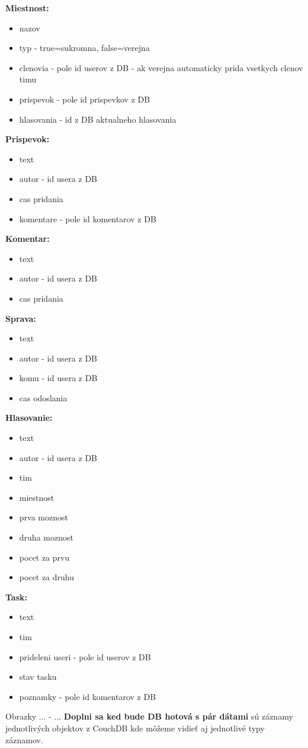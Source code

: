 \textbf{Miestnost:}
\indent\begin{itemize}
    \item nazov
    \item typ - true=sukromna, false=verejna
    \item clenovia - pole id userov z DB - ak verejna automaticky prida vsetkych clenov timu
    \item prispevok - pole id prispevkov z DB
    \item hlasovania - id z DB aktualneho hlasovania
\end{itemize}

\textbf{Prispevok:}
\indent\begin{itemize}
    \item text
    \item autor - id usera z DB
    \item cas pridania
    \item komentare - pole id komentarov z DB
\end{itemize}

\textbf{Komentar:}
\indent\begin{itemize}
    \item text
    \item autor - id usera z DB
    \item cas pridania
\end{itemize}

\textbf{Sprava:}
\indent\begin{itemize}
    \item text
    \item autor - id usera z DB
    \item komu - id usera z DB
    \item cas odoslania
\end{itemize}

\textbf{Hlasovanie:}
\indent\begin{itemize}
    \item text
    \item autor - id usera z DB
    \item tim
    \item miestnost
    \item prva moznost
    \item druha moznost
    \item pocet za prvu
    \item pocet za druhu
\end{itemize}

\textbf{Task:}
\indent\begin{itemize}
    \item text
    \item tim
    \item prideleni useri - pole id userov z DB
    \item stav tasku
    \item poznamky - pole id komentarov z DB
\end{itemize}

\indent Obrazky ... - ... \textbf{Doplni sa ked bude DB hotová s pár dátami} sú záznamy jednotlivých objektov z CouchDB kde môžeme vidieť aj jednotlivé typy záznamov. 
